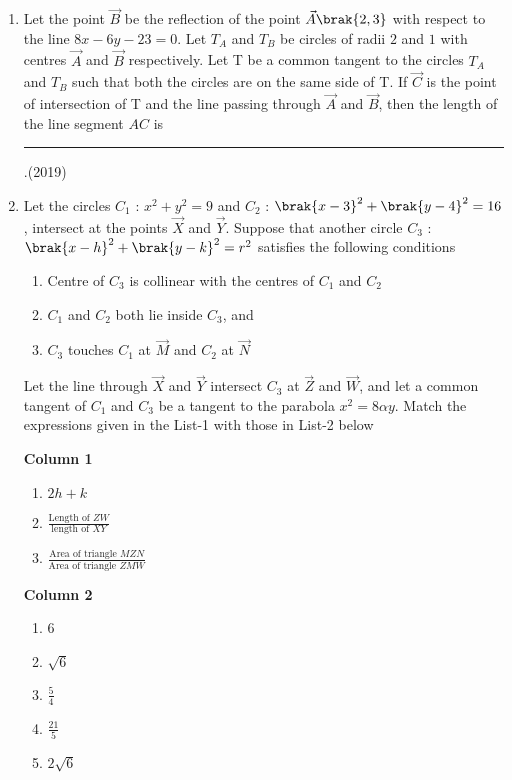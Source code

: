 \begin{enumerate}[label=\thesubsection.\arabic*.,ref=\thesubsection.\theenumi]
\item Let the point $\vec{B}$ be the reflection of the point $\vec{A}\brak{2, 3}$ with respect to the line $8x-6y-23=0$. Let $T_A$ and $T_B$ be circles of radii $2$ and $1$ with centres $\vec{A}$ and $\vec{B}$ respectively. Let T be a common tangent to the circles $T_A$ and $T_B$ such that both the circles are on the same side of T. If $\vec{C}$ is the point of intersection of T and the line passing through $\vec{A}$ and $\vec{B}$, then the length of the line segment $AC$ is  \rule{1cm}{0.01pt}.\hfill(2019)
    \item Let the circles $C_{1}$ : $x^2+y^2=9$ and $C_{2}$ : $\brak{x-3}^2+\brak{y-4}^2 = 16$,  intersect at the points $\vec{X}$ and $\vec{Y}$. Suppose that another circle $C_{3}$ : $\brak{x-h}^2+\brak{y-k}^2=r^2$ satisfies the following conditions
%
%
\begin{enumerate}
 \item Centre of $C_{3}$ is collinear with the centres of $C_{1}$ and $C_{2}$
 \item $C_{1}$ and $C_{2}$ both lie inside $C_{3}$,  and
%
 \item $C_{3}$ touches $C_{1}$ at $\vec{M}$ and $C_{2}$ at  $\vec{N}$ 
\end{enumerate}
Let the line through $\vec{X}$ and $\vec{Y}$ intersect $C_{3}$ at $\vec{Z}$ and $\vec{W}$,  and let a common tangent of $C_{1}$ and $C_{3}$ be a tangent to the parabola $x^2=8\alpha y.$
Match the expressions given in the List-1 with those in List-2 below
%
\begin{multicols}{2}
\textbf{Column 1}
\begin{enumerate}[label=(\Alph*)]           
\item $2h+k$                                  
\item $\frac{\text{Length of } ZW}{\text{length of } XY}$     
\item $\frac{\text{Area of triangle }MZN}{\text{Area of triangle }ZMW}$                     
\end{enumerate}
\columnbreak
 \textbf{Column 2}
\begin{enumerate}[label=(\alph*),  start=16, itemsep=1ex]
 \item 6
 \item $\sqrt{6}$
 \item $\frac{5}{4}$                           
 \item $\frac{21}{5}$                          
 \item $2\sqrt{6}$                             

\end{enumerate}
\end{multicols}
\end{enumerate}
